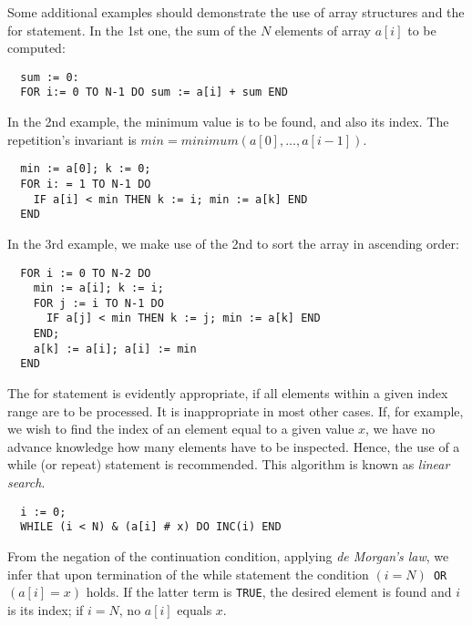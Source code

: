 Some additional examples should demonstrate the use of array structures and the for statement.
In the 1st one, the sum of the $N$ elements of array $a[i]$ to be computed:
\begin{verbatim}
  sum := 0:
  FOR i:= 0 TO N-1 DO sum := a[i] + sum END
\end{verbatim}
In the 2nd example, the minimum value is to be found, and also its index. The repetition's
invariant is $min = minimum(a[0], ... , a[i-1])$.
\begin{verbatim}
  min := a[0]; k := 0;
  FOR i: = 1 TO N-1 DO
    IF a[i] < min THEN k := i; min := a[k] END
  END
\end{verbatim}
In the 3rd example, we make use of the 2nd to sort the array in ascending order:
\begin{verbatim}
  FOR i := 0 TO N-2 DO
    min := a[i]; k := i;
    FOR j := i TO N-1 DO
      IF a[j] < min THEN k := j; min := a[k] END
    END;
    a[k] := a[i]; a[i] := min
  END
\end{verbatim}
The for statement is evidently appropriate, if all elements within a given index range are
to be processed. It is inappropriate in most other cases. If, for example, we wish to find
the index of an element equal to a given value $x$, we have no advance knowledge how many
elements have to be inspected. Hence, the use of a while (or repeat) statement is recommended.
This algorithm is known as \emph{linear search}.
\begin{verbatim}
  i := 0;
  WHILE (i < N) & (a[i] # x) DO INC(i) END
\end{verbatim}
From the negation of the continuation condition, applying \emph{de Morgan's law}, we infer
that upon termination of the while statement the condition $(i = N)$\verb| OR |$(a[i] = x)$
holds. If the latter term is \verb|TRUE|, the desired element is found and $i$ is its index;
if $i = N$, no $a[i]$ equals $x$.

